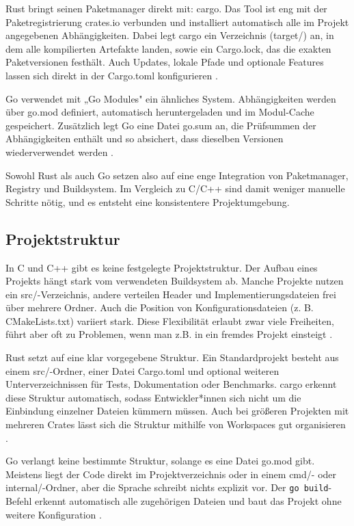 Rust bringt seinen Paketmanager direkt mit: cargo. Das Tool ist eng mit der Paketregistrierung crates.io 
verbunden und installiert automatisch alle im Projekt angegebenen Abhängigkeiten. 
Dabei legt cargo ein Verzeichnis (target/) an, in dem alle kompilierten Artefakte landen, sowie ein Cargo.lock, 
das die exakten Paketversionen festhält. Auch Updates, lokale Pfade und optionale Features lassen sich direkt in 
der Cargo.toml konfigurieren \autocite{HelloCargoRust}.

Go verwendet mit „Go Modules" ein ähnliches System. 
Abhängigkeiten werden über go.mod definiert, automatisch heruntergeladen und im Modul-Cache gespeichert. 
Zusätzlich legt Go eine Datei go.sum an, die Prüfsummen der Abhängigkeiten enthält und so absichert, 
dass dieselben Versionen wiederverwendet werden \autocite{ManagingDependenciesGo}.

Sowohl Rust als auch Go setzen also auf eine enge Integration von Paketmanager, Registry und Buildsystem. 
Im Vergleich zu C/C++ sind damit weniger manuelle Schritte nötig, und es entsteht eine konsistentere Projektumgebung.

\subsection{Projektstruktur}
\label{subsec:Projektstruktur}

In C und C++ gibt es keine festgelegte Projektstruktur. Der Aufbau eines Projekts hängt stark vom 
verwendeten Buildsystem ab. Manche Projekte nutzen ein src/-Verzeichnis, andere verteilen Header 
und Implementierungsdateien frei über mehrere Ordner. Auch die Position von Konfigurationsdateien (z. B. CMakeLists.txt) 
variiert stark. Diese Flexibilität erlaubt zwar viele Freiheiten, führt aber oft zu Problemen, wenn man z.B. 
in ein fremdes Projekt einsteigt \autocite{SurprisinglyComplexWorld}.

Rust setzt auf eine klar vorgegebene Struktur. Ein Standardprojekt besteht aus einem src/-Ordner, 
einer Datei Cargo.toml und optional weiteren Unterverzeichnissen für Tests, Dokumentation oder Benchmarks. 
cargo erkennt diese Struktur automatisch, sodass Entwickler*innen sich nicht um die Einbindung einzelner Dateien kümmern müssen. 
Auch bei größeren Projekten mit mehreren Crates lässt sich die Struktur mithilfe von Workspaces gut organisieren \autocite{HelloCargoRust}.

Go verlangt keine bestimmte Struktur, solange es eine Datei go.mod gibt. 
Meistens liegt der Code direkt im Projektverzeichnis oder in einem cmd/- oder internal/-Ordner, 
aber die Sprache schreibt nichts explizit vor. Der \texttt{go build}-Befehl erkennt automatisch alle zugehörigen Dateien 
und baut das Projekt ohne weitere Konfiguration \autocite{UsingGoModules}.

